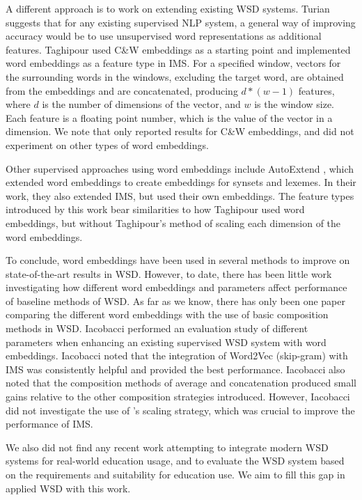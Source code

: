 A different approach is to work on extending existing WSD
systems. Turian  suggests that
for any existing supervised NLP system, a general way of improving
accuracy would be to use unsupervised word representations as
additional features. Taghipour  used C\&W
embeddings as a starting point and implemented word embeddings as a
feature type in IMS. For a specified window, vectors for the
surrounding words in the windows, excluding the target word, are
obtained from the embeddings and are concatenated, producing $d *
(w-1)$ features, where $d$ is the number of dimensions of the vector,
and $w$ is the window size. Each feature is a floating point number,
which is the value of the vector in a dimension. We note that
\cite{Taghipour15} only reported results for C\&W embeddings, and did
not experiment on other types of word embeddings.

Other supervised approaches using word embeddings include AutoExtend
\cite{rothe2015autoextend}, which extended word embeddings to create
embeddings for synsets and lexemes. In their work, they also extended
IMS, but used their own embeddings. The feature types
introduced by this work bear similarities to how Taghipour used
word embeddings, but without Taghipour's method of scaling each
dimension of the word embeddings.


To conclude, word embeddings have been used in several methods to
improve on state-of-the-art results in WSD. However, to date, there
has been little work investigating how different word embeddings and
parameters affect performance of baseline methods of WSD. As far as we
know, there has only been one paper comparing the different word
embeddings with the use of basic composition methods in WSD. Iacobacci
 performed an evaluation study of different
parameters when enhancing an existing supervised WSD system with word
embeddings. Iacobacci noted that the integration of Word2Vec
(skip-gram) with IMS was consistently helpful and provided the best
performance. Iacobacci also noted that the composition methods of
average and concatenation produced small gains relative to the other
composition strategies introduced. However, Iacobacci did not
investigate the use of \cite{Taghipour15}'s scaling strategy, which
was crucial to improve the performance of IMS.

We also did not find any recent work attempting to integrate modern
WSD systems for real-world education usage, and to evaluate the WSD
system based on the requirements and suitability for education use.
We aim to fill this gap in applied WSD with this work.

